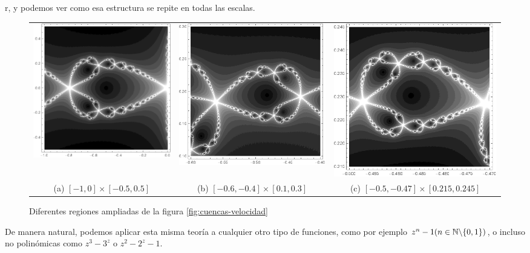 r, y podemos ver como esa estructura se repite en todas las escalas.

\newpage

\begin{figure}[h]
    \begin{tabular}{ccc}
      \includegraphics[scale=0.33]{./img/detalle-1.png} &   \includegraphics[scale=0.33]{./img/detalle-2.png} &   \includegraphics[scale=0.33]{./img/detalle-3.png} \\
    (a) $[-1,0]\times[-0.5,0.5]$ & (b) $[-0.6,-0.4]\times[0.1,0.3]$ & (c) $[-0.5,-0.47]\times[0.215,0.245]$ \\[6pt]
    \end{tabular}
    \caption{Diferentes regiones ampliadas de la figura \ref{fig:cuencas-velocidad}}
    \label{fig:detalles}
\end{figure}

De manera natural, podemos aplicar esta misma teoría a cualquier otro tipo de funciones, como por ejemplo $z^n-1 (n\in\mathbb{N}\backslash\{0,1\})$, o incluso no polinómicas como $z^3-3^z$ o $z^2-2^z-1$.
